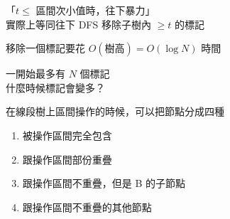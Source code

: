 \begin{frame}{}
    「$t \leq$ 區間次小值時，往下暴力」\\
    實際上等同往下 DFS 移除子樹內 $\geq t$ 的標記

     {
        移除一個標記要花 $O(\text{樹高}) = O(\log N)$ 時間

        一開始最多有 $N$ 個標記 \\
        什麼時候標記會變多？
    }
\end{frame}

\begin{frame}{}
    在線段樹上區間操作的時候，可以把節點分成四種

    \begin{enumerate}[A]
        \item 被操作區間完全包含
        \item 跟操作區間部份重疊
        \item 跟操作區間不重疊，但是 B 的子節點
        \item 跟操作區間不重疊的其他節點
    \end{enumerate}


\end{frame}
